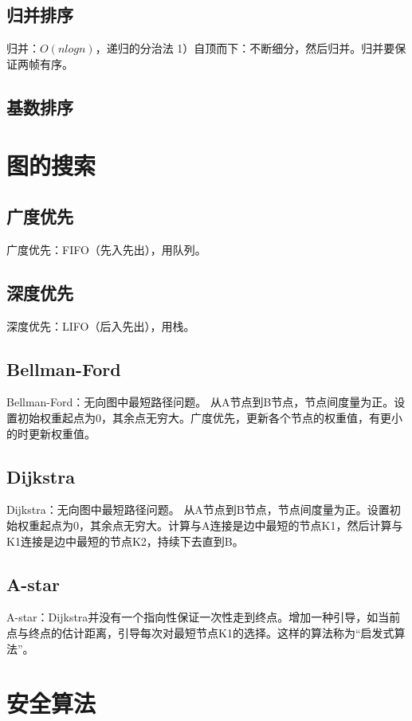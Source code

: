 \documentclass[UTF8]{../computerUniverse}
\begin{document}
\subsection{归并排序}

归并：$O(nlogn)$，递归的分治法
1）自顶而下：不断细分，然后归并。归并要保证两帧有序。


\subsection{基数排序}




\section{图的搜索}

\subsection{广度优先}
广度优先：FIFO（先入先出），用队列。


\subsection{深度优先}
深度优先：LIFO（后入先出），用栈。


\subsection{Bellman-Ford}
Bellman-Ford：无向图中最短路径问题。
从A节点到B节点，节点间度量为正。设置初始权重起点为0，其余点无穷大。广度优先，更新各个节点的权重值，有更小的时更新权重值。


\subsection{Dijkstra}
Dijkstra：无向图中最短路径问题。
从A节点到B节点，节点间度量为正。设置初始权重起点为0，其余点无穷大。计算与A连接是边中最短的节点K1，然后计算与K1连接是边中最短的节点K2，持续下去直到B。


\subsection{A-star}
A-star：Dijkstra并没有一个指向性保证一次性走到终点。增加一种引导，如当前点与终点的估计距离，引导每次对最短节点K1的选择。这样的算法称为“启发式算法”。



\section{安全算法}
\end{document}
